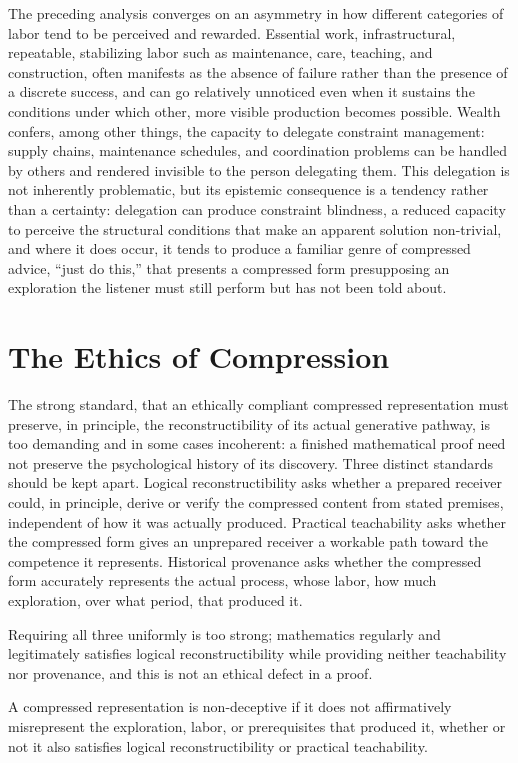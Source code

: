 The preceding analysis converges on an asymmetry in how different categories of labor tend to be perceived and rewarded. Essential work, infrastructural, repeatable, stabilizing labor such as maintenance, care, teaching, and construction, often manifests as the absence of failure rather than the presence of a discrete success, and can go relatively unnoticed even when it sustains the conditions under which other, more visible production becomes possible. Wealth confers, among other things, the capacity to delegate constraint management: supply chains, maintenance schedules, and coordination problems can be handled by others and rendered invisible to the person delegating them. This delegation is not inherently problematic, but its epistemic consequence is a tendency rather than a certainty: delegation can produce constraint blindness, a reduced capacity to perceive the structural conditions that make an apparent solution non-trivial, and where it does occur, it tends to produce a familiar genre of compressed advice, ``just do this,'' that presents a compressed form presupposing an exploration the listener must still perform but has not been told about.

\section{The Ethics of Compression}

The strong standard, that an ethically compliant compressed representation must preserve, in principle, the reconstructibility of its actual generative pathway, is too demanding and in some cases incoherent: a finished mathematical proof need not preserve the psychological history of its discovery. Three distinct standards should be kept apart. Logical reconstructibility asks whether a prepared receiver could, in principle, derive or verify the compressed content from stated premises, independent of how it was actually produced. Practical teachability asks whether the compressed form gives an unprepared receiver a workable path toward the competence it represents. Historical provenance asks whether the compressed form accurately represents the actual process, whose labor, how much exploration, over what period, that produced it.

Requiring all three uniformly is too strong; mathematics regularly and legitimately satisfies logical reconstructibility while providing neither teachability nor provenance, and this is not an ethical defect in a proof.

\begin{definition}
A compressed representation is non-deceptive if it does not affirmatively misrepresent the exploration, labor, or prerequisites that produced it, whether or not it also satisfies logical reconstructibility or practical teachability.
\end{definition}

